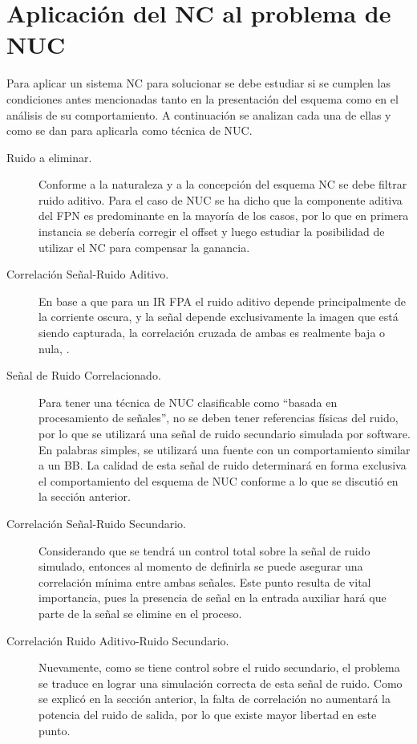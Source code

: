 \section{Aplicación del NC al problema de NUC}
Para aplicar un sistema \ac{NC} para solucionar se debe estudiar si se cumplen las condiciones antes mencionadas tanto en la presentación del esquema como en el análisis de su comportamiento. A continuación se analizan cada una de ellas y como se dan para aplicarla como técnica de \ac{NUC}.

\begin{description}
 \item[Ruido a eliminar.] Conforme a la naturaleza y a la concepción del esquema \ac{NC} se debe filtrar ruido aditivo. Para el caso de \ac{NUC} se ha dicho que la componente aditiva del \ac{FPN} es predominante en la mayoría de los casos, por lo que en primera instancia se debería corregir el offset y luego estudiar la posibilidad de utilizar el \ac{NC} para compensar la ganancia.
 \item[Correlación Señal-Ruido Aditivo.] En base a que para un \ac{IR} \ac{FPA} el ruido aditivo depende principalmente de la corriente oscura, y la señal depende exclusivamente la imagen que está siendo capturada, la correlación cruzada de ambas es realmente baja o nula, \cite{godoy-ncs}.
 \item[Señal de Ruido Correlacionado.] Para tener una técnica de \ac{NUC} clasificable como ``basada en procesamiento de señales'', no se deben tener referencias físicas del ruido, por lo que se utilizará una señal de ruido secundario simulada por software. En palabras simples, se utilizará una fuente con un comportamiento similar a un \ac{BB}. La calidad de esta señal de ruido determinará en forma exclusiva el comportamiento del esquema de \ac{NUC} conforme a lo que se discutió en la sección anterior.
 \item[Correlación Señal-Ruido Secundario.] Considerando que se tendrá un control total sobre la señal de ruido simulado, entonces al momento de definirla se puede asegurar una correlación mínima entre ambas señales. Este punto resulta de vital importancia, pues la presencia de señal en la entrada auxiliar hará que parte de la señal se elimine en el proceso.
 \item[Correlación Ruido Aditivo-Ruido Secundario.] Nuevamente, como se tiene control sobre el ruido secundario, el problema se traduce en lograr una simulación correcta de esta señal de ruido. Como se explicó en la sección anterior, la falta de correlación no aumentará la potencia del ruido de salida, por lo que existe mayor libertad en este punto.
\end{description}


